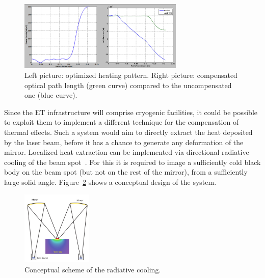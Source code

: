 \begin{figure}[!h]
\centering
\includegraphics[width=0.7\textwidth]{Sec_Optics/TCS_4c.png}
\caption{Left picture: optimized heating pattern. Right picture: compensated optical path length (green curve) compared to the uncompensated one (blue curve).}
\label{Fig:Sec_Optics_TCS4}   
\end{figure}

Since the ET infrastructure will comprise cryogenic facilities, it could be possible to exploit them to implement a
 different technique for the compensation of thermal effects.
Such a system would aim to directly extract the heat deposited by the laser beam, before it has a chance to generate any deformation of
 the mirror. Localized heat extraction can be implemented via directional radiative cooling of the beam spot~\cite{kamp2009}. 
 For this it is required  to image a sufficiently cold black
body on the beam spot (but not on
the rest of the mirror), from a sufficiently large solid angle. Figure~\ref{Fig:Sec_Optics_TCS6} shows a conceptual design of the system.

\begin{figure}[!h]
\centering
\includegraphics[width=0.3\textwidth]{Sec_Optics/TCS_6.pdf}
\caption{Conceptual scheme of the radiative cooling.}
\label{Fig:Sec_Optics_TCS6}   
\end{figure}


